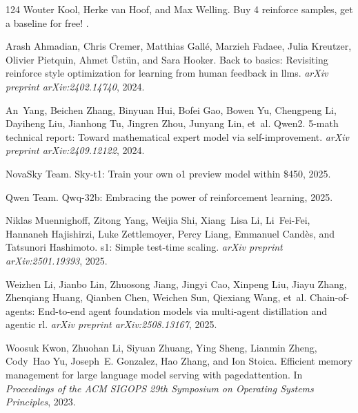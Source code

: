 \documentclass[]{youtu} %
\begin{document}
\begin{thebibliography}{124}
Wouter Kool, Herke van Hoof, and Max Welling.
\newblock Buy 4 reinforce samples, get a baseline for free!
.

Arash Ahmadian, Chris Cremer, Matthias Gall{\'e}, Marzieh Fadaee, Julia Kreutzer, Olivier Pietquin, Ahmet {\"U}st{\"u}n, and Sara Hooker.
\newblock Back to basics: Revisiting reinforce style optimization for learning from human feedback in llms.
\newblock \emph{arXiv preprint arXiv:2402.14740}, 2024.

An~Yang, Beichen Zhang, Binyuan Hui, Bofei Gao, Bowen Yu, Chengpeng Li, Dayiheng Liu, Jianhong Tu, Jingren Zhou, Junyang Lin, et~al.
\newblock Qwen2. 5-math technical report: Toward mathematical expert model via self-improvement.
\newblock \emph{arXiv preprint arXiv:2409.12122}, 2024.

NovaSky Team.
\newblock Sky-t1: Train your own o1 preview model within \$450, 2025{}.

Qwen Team.
\newblock Qwq-32b: Embracing the power of reinforcement learning, 2025{}.

Niklas Muennighoff, Zitong Yang, Weijia Shi, Xiang~Lisa Li, Li~Fei-Fei, Hannaneh Hajishirzi, Luke Zettlemoyer, Percy Liang, Emmanuel Cand{\`e}s, and Tatsunori Hashimoto.
\newblock s1: Simple test-time scaling.
\newblock \emph{arXiv preprint arXiv:2501.19393}, 2025.

Weizhen Li, Jianbo Lin, Zhuosong Jiang, Jingyi Cao, Xinpeng Liu, Jiayu Zhang, Zhenqiang Huang, Qianben Chen, Weichen Sun, Qiexiang Wang, et~al.
\newblock Chain-of-agents: End-to-end agent foundation models via multi-agent distillation and agentic rl.
\newblock \emph{arXiv preprint arXiv:2508.13167}, 2025{}.

Woosuk Kwon, Zhuohan Li, Siyuan Zhuang, Ying Sheng, Lianmin Zheng, Cody~Hao Yu, Joseph~E. Gonzalez, Hao Zhang, and Ion Stoica.
\newblock Efficient memory management for large language model serving with pagedattention.
\newblock In \emph{Proceedings of the ACM SIGOPS 29th Symposium on Operating Systems Principles}, 2023.


\end{thebibliography}
\end{document}
